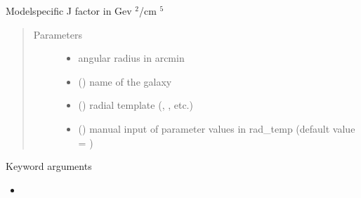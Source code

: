 \documentclass[letterpaper,10pt,english]{sphinxmanual}
\begin{document}

\begin{fulllineitems}
\label{\detokenize{diffsph.profiles:diffsph.profiles.massmodels.J}}
\sphinxAtStartPar
Model\sphinxhyphen{}specific J factor in Gev \({}^2\)/cm \({}^5\)
\begin{quote}\begin{description}
\item[{Parameters}] \leavevmode\begin{itemize}
\item {} 
\sphinxAtStartPar
{} \textendash{} angular radius in arcmin

\item {} 
\sphinxAtStartPar
{} () \textendash{} name of the galaxy

\item {} 
\sphinxAtStartPar
{} () \textendash{} radial template (, , etc.)

\item {} 
\sphinxAtStartPar
{} () \textendash{} manual input of parameter values in rad\_temp (default value = )

\end{itemize}

\end{description}\end{quote}

\sphinxAtStartPar
Keyword arguments
\begin{itemize}
\item {} 
\sphinxAtStartPar
{}


\end{itemize}
\end{fulllineitems}
\end{document}
